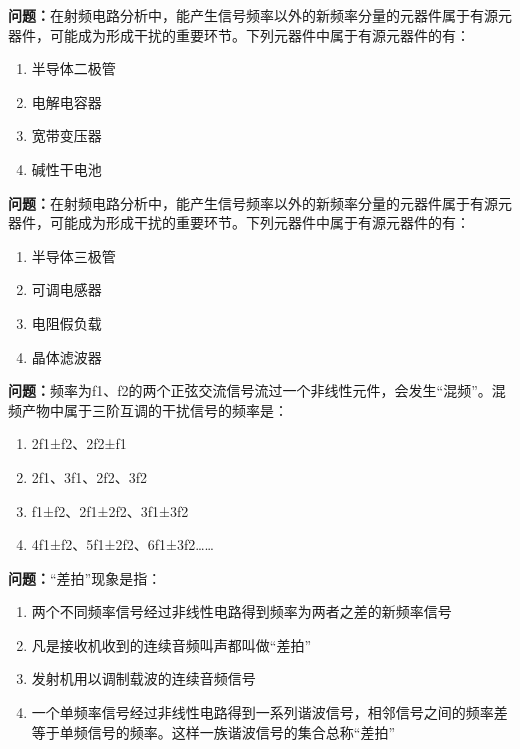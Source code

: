 \bigskip


\noindent\textbf{问题：}在射频电路分析中，能产生信号频率以外的新频率分量的元器件属于有源元器件，可能成为形成干扰的重要环节。下列元器件中属于有源元器件的有：
\begin{enumerate}[label=\Alph*), leftmargin=3em]
\item 半导体二极管
\item 电解电容器
\item 宽带变压器
\item 碱性干电池
\end{enumerate}

\bigskip


\noindent\textbf{问题：}在射频电路分析中，能产生信号频率以外的新频率分量的元器件属于有源元器件，可能成为形成干扰的重要环节。下列元器件中属于有源元器件的有：
\begin{enumerate}[label=\Alph*), leftmargin=3em]
\item 半导体三极管
\item 可调电感器
\item 电阻假负载
\item 晶体滤波器
\end{enumerate}

\bigskip


\noindent\textbf{问题：}频率为f1、f2的两个正弦交流信号流过一个非线性元件，会发生“混频”。混频产物中属于三阶互调的干扰信号的频率是：
\begin{enumerate}[label=\Alph*), leftmargin=3em]
\item 2f1±f2、2f2±f1
\item 2f1、3f1、2f2、3f2
\item f1±f2、2f1±2f2、3f1±3f2
\item 4f1±f2、5f1±2f2、6f1±3f2……
\end{enumerate}

\bigskip


\noindent\textbf{问题：}“差拍”现象是指：
\begin{enumerate}[label=\Alph*), leftmargin=3em]
\item 两个不同频率信号经过非线性电路得到频率为两者之差的新频率信号
\item 凡是接收机收到的连续音频叫声都叫做“差拍”
\item 发射机用以调制载波的连续音频信号
\item 一个单频率信号经过非线性电路得到一系列谐波信号，相邻信号之间的频率差等于单频信号的频率。这样一族谐波信号的集合总称“差拍”
\end{enumerate}

